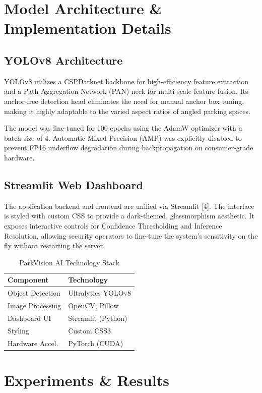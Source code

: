 \documentclass[conference]{IEEEtran}
\begin{document}
\section{Model Architecture \& Implementation Details}
\subsection{YOLOv8 Architecture}
YOLOv8 utilizes a CSPDarknet backbone for high-efficiency feature extraction and a Path Aggregation Network (PAN) neck for multi-scale feature fusion. Its anchor-free detection head eliminates the need for manual anchor box tuning, making it highly adaptable to the varied aspect ratios of angled parking spaces. 

The model was fine-tuned for 100 epochs using the AdamW optimizer with a batch size of 4. Automatic Mixed Precision (AMP) was explicitly disabled to prevent FP16 underflow degradation during backpropagation on consumer-grade hardware. 

\subsection{Streamlit Web Dashboard}
The application backend and frontend are unified via Streamlit [4]. The interface is styled with custom CSS to provide a dark-themed, glassmorphism aesthetic. It exposes interactive controls for Confidence Thresholding and Inference Resolution, allowing security operators to fine-tune the system's sensitivity on the fly without restarting the server.

\begin{table}[htbp]
\caption{ParkVision AI Technology Stack}
\begin{center}
\begin{tabular}{ll}
\toprule
\textbf{Component} & \textbf{Technology} \\
\midrule
Object Detection & Ultralytics YOLOv8 \\
Image Processing & OpenCV, Pillow \\
Dashboard UI & Streamlit (Python) \\
Styling & Custom CSS3 \\
Hardware Accel. & PyTorch (CUDA) \\
\bottomrule
\end{tabular}
\label{tab1}
\end{center}
\end{table}

\section{Experiments \& Results}
\end{document}
